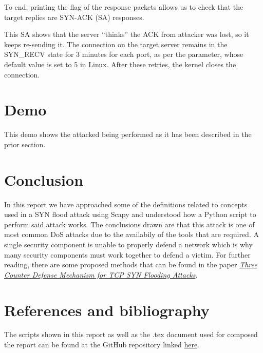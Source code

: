 \documentclass[11pt]{article}
\begin{document}
To end, printing the flag of the response packets allows us to check that the target replies are SYN-ACK (SA) responses.\vspace{5mm}

This SA shows that the server “thinks” the ACK from attacker was lost, so it keeps re-sending it. The connection on the target server remains in the SYN\_RECV state for 3 minutes for each port, as per the \texttt{} parameter, whose default value is set to 5 in Linux. After these retries, the kernel closes the connection.\vspace{5mm}

\section{Demo}
This demo shows the attacked being performed as it has been described in the prior section.

\section{Conclusion}
In this report we have approached some of the definitions related to concepts used in a SYN flood attack using Scapy and understood how a Python script to perform said attack works. The conclusions drawn are that this attack is one of most common DoS attacks due to the availabily of the tools that are required. A single security component is unable to properly defend a network which is why many security components must work together to defend a victim. For further reading, there are some proposed methods that can be found in the paper \emph{\href{http://citeseerx.ist.psu.edu/viewdoc/download?doi=10.1.1.206.5378&rep=rep1&type=pdf}{Three Counter Defense Mechanism for TCP SYN Flooding Attacks}}. 

\section{References and bibliography}

The scripts shown in this report as well as the .tex document used for composed the report can be found at the GitHub repository linked \href{https://github.com/beagaliana/syn-flooding-attack}{here}.\vspace{5mm}
\end{document}
